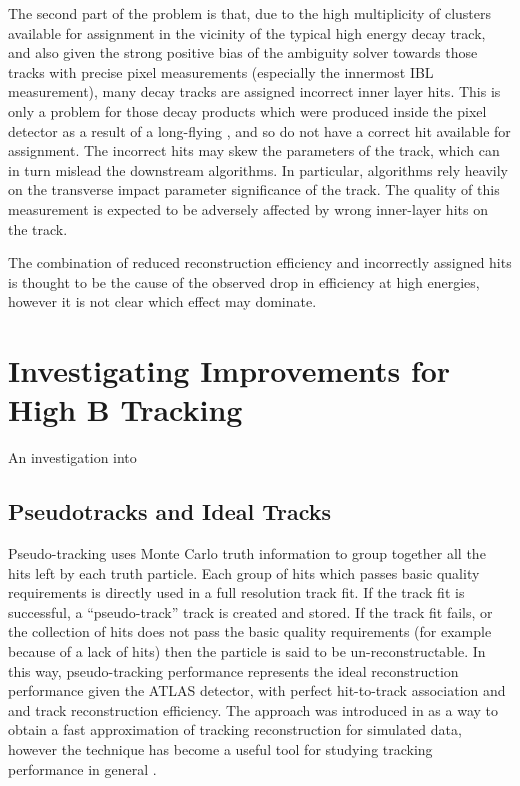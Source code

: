 The second part of the problem is that, due to the high multiplicity of clusters available for assignment in the vicinity of the typical high energy \bhadron decay track, and also given the strong positive bias of the ambiguity solver towards those tracks with precise pixel measurements (especially the innermost IBL measurement), many \bhadron decay tracks are assigned incorrect inner layer hits.
This is only a problem for those decay products which were produced inside the pixel detector as a result of a long-flying \bhadron, and so do not have a correct hit available for assignment.
The incorrect hits may skew the parameters of the track, which can in turn mislead the downstream \btagging algorithms.
In particular, \btagging algorithms rely heavily on the transverse impact parameter significance \dzerosig of the track.
The quality of this measurement is expected to be adversely affected by wrong inner-layer hits on the track. 

The combination of reduced reconstruction efficiency and incorrectly assigned hits is thought to be the cause of the observed drop in \btagging efficiency at high energies, however it is not clear which effect may dominate.









\section{Investigating Improvements for High \texorpdfstring{\pT}{pT} B Tracking}\label{sec:b_track_reco_improvements}

An investigation into


\subsection{Pseudotracks and Ideal Tracks}\label{sec:pseudo ideal tracking}

Pseudo-tracking uses Monte Carlo truth information to group together all the hits left by each truth particle.
Each group of hits which passes basic quality requirements is directly used in a full resolution track fit.
If the track fit is successful, a ``pseudo-track'' track is created and stored.
If the track fit fails, or the collection of hits does not pass the basic quality requirements (for example because of a lack of hits) then the particle is said to be un-reconstructable.
In this way, pseudo-tracking performance represents the ideal reconstruction performance given the ATLAS detector, with perfect hit-to-track association and and track reconstruction efficiency.
The approach was introduced in \cite{Jansky:2013ryb} as a way to obtain a fast approximation of tracking reconstruction for simulated data, however the technique has become a useful tool for studying tracking performance in general \cite{ATL-PHYS-PUB-2015-006}.

